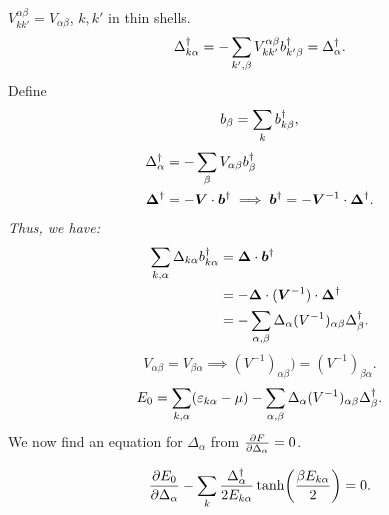 $V_{kk'}^{\alpha\beta} = V_{\alpha\beta}$, $k,k'$ in thin shells.
\begin{equation}
	\Delta_{k\alpha}^{\dagger} = -\sum_{k',\beta}V_{kk'}^{\alpha\beta}b_{k'\beta}^{\dagger} = \Delta_{\alpha}^{\dagger}.
\end{equation}
Define 
\begin{equation}
	b_{\beta} = \sum_{k}b_{k\beta}^{\dagger},
\end{equation}
\begin{align}
	\Delta_{\alpha}^{\dagger} &= -\sum_{\beta}V_{\alpha\beta}b_{\beta}^{\dagger} \\
	\bm{\Delta}^{\dagger} &= -\bm{V}\cdot \bm{b}^{\dagger} \implies \bm{b}^{\dagger} = -\bm{V}^{-1}\cdot\bm{\Delta}^{\dagger}.
\end{align}
\emph{Thus, we have:}
\begin{align}
	\sum_{k,\alpha}\Delta_{k\alpha}b_{k\alpha}^{\dagger}&= \bm{\Delta}\cdot\bm{b}^{\dagger}\nonumber \\
	&= - \bm{\Delta}\cdot (\bm{V}^{-1})\cdot \bm{\Delta}^{\dagger} \nonumber \\
	&= -\sum_{\alpha,\beta}\Delta_{\alpha}(V^{-1})_{\alpha\beta}\Delta_{\beta}^{\dagger}.
\end{align}
\begin{equation}
	V_{\alpha\beta} = V_{\beta\alpha} \implies (V^{-1})_{\alpha\beta})=(V^{-1})_{\beta\alpha}.
\end{equation}
\begin{equation}
	E_0 = \sum_{k,\alpha}(\varepsilon_{k\alpha}-\mu)- \sum_{\alpha, \beta}\Delta_{\alpha}(V^{-1})_{\alpha\beta}\Delta_{\beta}^{\dagger}.
\end{equation}
We now find an equation for $\Delta_\alpha$ from $\pdv{F}{\Delta_{\alpha}} = 0$.
\begin{tcolorbox}
	\begin{equation}
		\pdv{E_0}{\Delta_{\alpha}} - \sum_{k}\frac{\Delta_{\alpha}^{\dagger}}{2E_{k\alpha}}\tanh(\frac{\beta E_{k\alpha}}{2}) = 0.
	\end{equation}
\end{tcolorbox}
